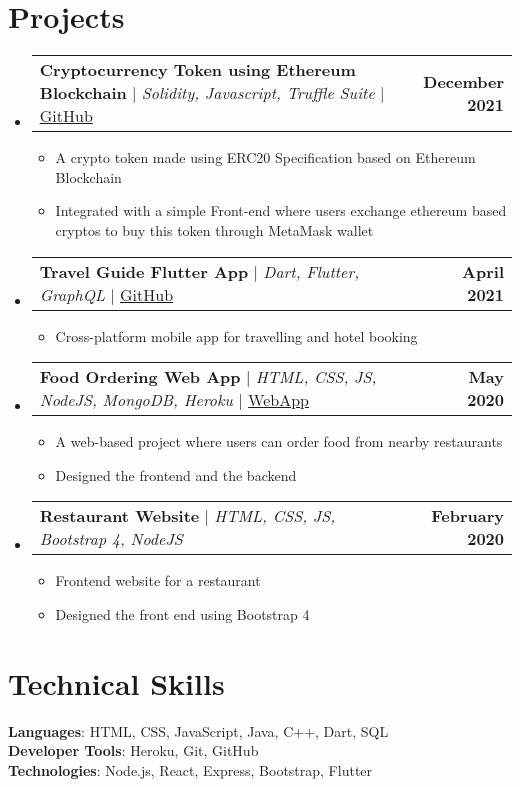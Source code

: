 \documentclass[letterpaper,11pt]{article}
\makeatletter
\newcommand{\resumeItem}[1]{
  \item\small{
    {#1 \vspace{-2pt}}
  }
}
\newcommand{\resumeProjectHeading}[2]{
    \item
    \begin{tabular*}{1.001\textwidth}{l@{\extracolsep{\fill}}r}
      \small#1 & \textbf{\small #2} \\
    \end{tabular*}\vspace{-7pt}
}
\newcommand{\resumeSubHeadingListStart}{\begin{itemize}[leftmargin=0.0in, label={}]}
\newcommand{\resumeSubHeadingListEnd}{\end{itemize}}
\newcommand{\resumeItemListStart}{\justify \begin{itemize}}
\newcommand{\resumeItemListEnd}{\end{itemize}\vspace{-2pt}}
\makeatother
\begin{document}
\section{Projects}
    \vspace{-5pt}
    \resumeSubHeadingListStart
        \resumeProjectHeading
            {\textbf{Cryptocurrency Token using Ethereum Blockchain} $|$ \emph{Solidity, Javascript, Truffle Suite}  $|$ \href{https://github.com/PowerBlockx/Crypto-Token}{GitHub}}{December 2021}
            \resumeItemListStart
                \resumeItem{A crypto token made using ERC20 Specification based on Ethereum Blockchain}
                \resumeItem{Integrated with a simple Front-end where users exchange ethereum based cryptos to buy this token through MetaMask wallet}
            \resumeItemListEnd
        \resumeProjectHeading
            {\textbf{Travel Guide Flutter App} $|$ \emph{Dart, Flutter, GraphQL} $|$ \href{https://github.com/cu-project-2021/Travel-Guide-flutter}{GitHub}}{April 2021} 
            \resumeItemListStart
                \resumeItem{Cross-platform mobile app for travelling and hotel booking}
            \resumeItemListEnd 
        \resumeProjectHeading
            {\textbf{Food Ordering Web App} $|$ \emph{HTML, CSS, JS, NodeJS, MongoDB, Heroku} $|$ \href{https://licious-veau.herokuapp.com/}{WebApp}}{May 2020} 
            \resumeItemListStart
                \resumeItem{A web-based project where users can order food from nearby restaurants}
                \resumeItem{Designed the frontend and the backend}
            \resumeItemListEnd 
        \resumeProjectHeading
            {\textbf{Restaurant Website} $|$ \emph{HTML, CSS, JS, Bootstrap 4, NodeJS}} {February 2020} 
            \resumeItemListStart
                \resumeItem{Frontend website for a restaurant }
                \resumeItem{Designed the front end using Bootstrap 4}
            \resumeItemListEnd 
    \resumeSubHeadingListEnd


%
\section{Technical Skills}
 \begin{itemize}[leftmargin=0.15in, label={}]
    {\item{
     \textbf{Languages}{: HTML, CSS, JavaScript, Java, C++, Dart, SQL} \\
     \vspace{1pt}
     \textbf{Developer Tools}{: Heroku, Git, GitHub } \\
     \vspace{1pt}
     \textbf{Technologies}{: Node.js, React, Express, Bootstrap, Flutter} \\
    }}
 \end{itemize}
 \vspace{-16pt}
\end{document}
